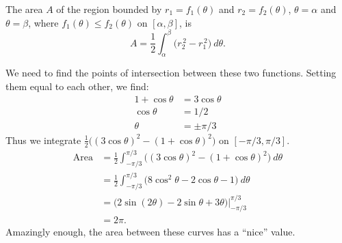{The area $A$ of the region bounded by $r_1=f_1(\theta)$ and $r_2=f_2(\theta)$, $\theta=\alpha$ and $\theta=\beta$, where $f_1(\theta)\leq f_2(\theta)$ on $[\alpha,\beta]$, is
$$A = \frac12\int_\alpha^\beta \big(r_2^{\,2}-r_1^{\,2}\big)\ d\theta.$$
}

\enlargethispage{2\baselineskip}
{We need to find the points of intersection between these two functions. Setting them equal to each other, we find:
\begin{align*}
1+\cos\theta &= 3\cos \theta \\
 \cos\theta &=1/2\\
\theta &= \pm \pi/3
\end{align*}
Thus we integrate $\frac12\big((3\cos\theta)^2-(1+\cos\theta)^2\big)$ on $[-\pi/3,\pi/3]$.
\begin{align*}
\text{Area} &= \frac12\int_{-\pi/3}^{\pi/3} \big((3\cos\theta)^2-(1+\cos\theta)^2\big)\ d\theta\\
		&= \frac12\int_{-\pi/3}^{\pi/3} \big( 8\cos^2\theta-2\cos\theta-1\big)\ d\theta \\
		&= \big(2\sin(2\theta) - 2\sin\theta+3\theta\big)\Bigg|_{-\pi/3}^{\pi/3}\\
		&= 2\pi.
\end{align*}
Amazingly enough, the area between these curves has a ``nice'' value.
}\\

